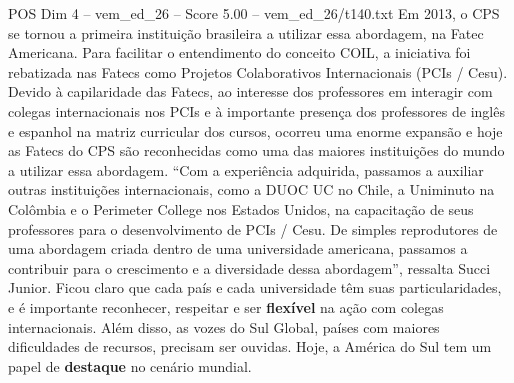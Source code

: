 \begin{textsample}{POS Dim 4 – vem\_ed\_26 – Score 5.00 – vem\_ed\_26/t140.txt}
Em 2013, o CPS se tornou a primeira instituição brasileira a utilizar essa abordagem, na Fatec Americana.
Para facilitar o entendimento do conceito COIL, a iniciativa foi rebatizada nas Fatecs como Projetos Colaborativos Internacionais (PCIs / Cesu).
Devido à capilaridade das Fatecs, ao interesse dos professores em interagir com colegas internacionais nos PCIs e à importante presença dos professores de inglês e espanhol na matriz curricular dos cursos, ocorreu uma enorme expansão e hoje as Fatecs do CPS são reconhecidas como uma das maiores instituições do mundo a utilizar essa abordagem. “Com a experiência adquirida, passamos a auxiliar outras instituições internacionais, como a DUOC UC no Chile, a Uniminuto na Colômbia e o Perimeter College nos Estados Unidos, na capacitação de seus professores para o desenvolvimento de PCIs / Cesu.
De simples reprodutores de uma abordagem criada dentro de uma universidade americana, passamos a contribuir para o crescimento e a diversidade dessa abordagem”, ressalta Succi Junior.
Ficou claro que cada país e cada universidade têm suas particularidades, e é importante reconhecer, respeitar e ser \textbf{flexível} na ação com colegas internacionais.
Além disso, as vozes do Sul Global, países com maiores dificuldades de recursos, precisam ser ouvidas.
Hoje, a América do Sul tem um papel de \textbf{destaque} no cenário mundial.

\end{textsample}
